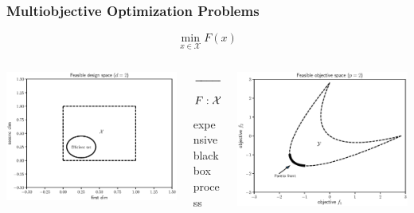 \documentclass[aspectratio=169]{beamer}
\begin{document}
\begin{frame}\frametitle{Multiobjective Optimization Problems}
\begin{center}
{\Large
$$
\min_{x \in \mathcal{X}} F(x)
$$
}%
\end{center}
\begin{columns}
\begin{column}{.35\textwidth}
\includegraphics[width=\textwidth]{../img/moo_old/feasible_design.eps}
\end{column}
\begin{column}{.2\textwidth}
\begin{center}
$\xrightarrow{\hspace*{2cm}}$
$$
F : {\cal X} \rightarrow {\cal Y}
$$
expensive blackbox process
\end{center}
\end{column}
\begin{column}{.35\textwidth}
\includegraphics[width=\textwidth]{../img/moo_old/convex_pareto.eps}
\end{column}
\end{columns}
\end{frame}
\end{document}
